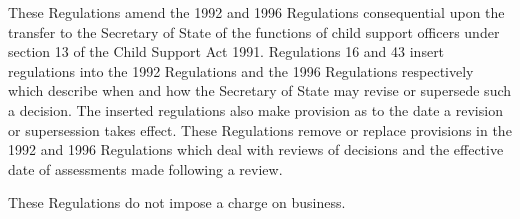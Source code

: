 \documentclass[12pt,a4paper]{article}
\begin{document}
  These Regulations amend the 1992 and 1996 Regulations consequential upon the transfer to the Secretary of State of the functions of child support officers under section 13 of the Child Support Act 1991. Regulations 16 and 43 insert regulations into the 1992 Regulations and the 1996 Regulations respectively which describe when and how the Secretary of State may revise or supersede such a decision. The inserted regulations also make provision as to the date a revision or supersession takes effect. These Regulations remove or replace provisions in the 1992 and 1996 Regulations which deal with reviews of decisions and the effective date of assessments made following a review.

  These Regulations do not impose a charge on business.
\end{document}
